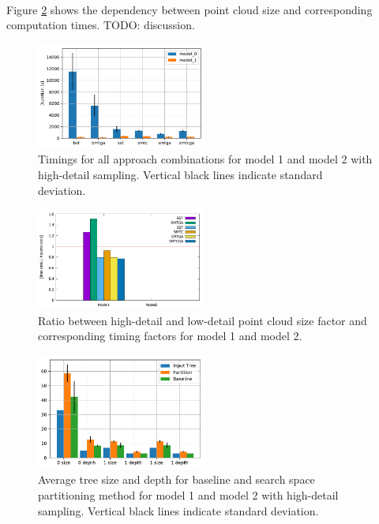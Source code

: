  
\\  
Figure \ref{fig:graph3} shows the dependency between point cloud size and corresponding computation times. TODO: discussion.
\begin{figure}[htb]
	\centering
	\includegraphics[width=0.5\textwidth]{figures/g1.pdf}
	\caption{Timings for all approach combinations for model 1 and model 2 with high-detail sampling. Vertical black lines indicate standard deviation.}
	\label{fig:graph1}
\end{figure}
\begin{figure}[htb]
	\centering
	\includegraphics[width=0.5\textwidth]{figures/g3.pdf}
	\caption{Ratio between high-detail and low-detail point cloud size factor and corresponding timing factors for model 1 and model 2.}
	\label{fig:graph3}
\end{figure}

\begin{figure}[htb]
	\centering
	\includegraphics[width=0.5\textwidth]{figures/g2.pdf}
	\caption{Average tree size and depth for baseline and search space partitioning method for model 1 and model 2 with high-detail sampling. Vertical black lines indicate standard deviation.}
	\label{fig:graph2}
\end{figure}
